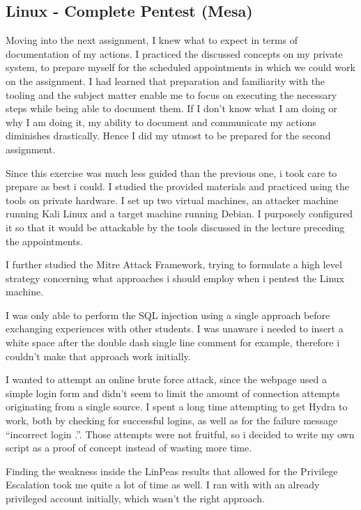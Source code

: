 \documentclass[../report.tex]{subfiles}
\begin{document}
\subsection{Linux - Complete Pentest (Mesa)}

Moving into the next assignment, I knew what to expect in terms of documentation of my actions. I practiced the discussed concepts on my private system, to prepare myself for the scheduled appointments in which we could work on the assignment. I had learned that preparation and familiarity with the tooling and the subject matter enable me to focus on executing the necessary steps while being able to document them. If I don't know what I am doing or why I am doing it, my ability to document and communicate my actions diminishes drastically. Hence I did my utmost to be prepared for the second assignment. 

Since this exercise was much less guided than the previous one, i took care to prepare as best i could.
I studied the provided materials and practiced using the tools on private hardware.
I set up two virtual machines, an attacker machine running Kali Linux and a target machine running Debian. I purposely configured it so that it would be attackable by the tools discussed in the lecture preceding the appointments.

I further studied the Mitre Attack Framework, trying to formulate a high level strategy concerning what approaches i should employ when i pentest the Linux machine.

I was only able to perform the SQL injection using a single approach before exchanging experiences with other students. I was unaware i needed to insert a white space after the double dash single line comment for example, therefore i couldn't make that approach work initially.

I wanted to attempt an online brute force attack, since the webpage used a simple login form and didn't seem to limit the amount of connection attempts originating from a single source.
I spent a long time attempting to get Hydra to work, both by checking for successful logins, as well as for the failure message \enquote{incorrect login .}.
Those attempts were not fruitful, so i decided to write my own script as a proof of concept instead of wasting more time.

Finding the weakness inside the LinPeas results that allowed for the Privilege Escalation took me quite a lot of time as well. I ran with with an already privileged account initially, which wasn't the right approach.
\end{document}
